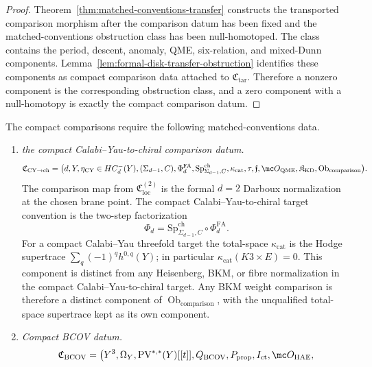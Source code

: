 \begin{proof}
  Theorem~\ref{thm:matched-conventions-transfer} constructs the transported
  comparison morphism after the comparison datum has been fixed and the
  matched-conventions obstruction class has been null-homotoped.  The class
  contains the period, descent, anomaly, QME, six-relation, and
  mixed-Dunn components.  Lemma~\ref{lem:formal-disk-transfer-obstruction}
  identifies these components as compact comparison data attached to
  \(\mathfrak C_{\mathrm{tar}}\).  Therefore a nonzero component is
  the corresponding obstruction class, and a zero component with a
  null-homotopy is exactly the compact comparison datum.
\end{proof}

\begin{defn}\label{defn:compact-comparison-data}
  The compact comparisons require the following matched-conventions data.
  \begin{enumerate}[label=(\roman*)]
    \item \emph{the compact Calabi--Yau-to-chiral comparison datum.}
      \[
      \mathfrak C_{\mathrm{CY\to ch}}=
      \bigl(d,Y,\eta_{\mathrm{CY}}\in HC^-_d(Y),
      (\Sigma_{d-1},C),\Phi^{\mathrm{FA}}_d,
	      \mathrm{Sp}^{\mathrm{ch}}_{\Sigma_{d-1},C},\kappa_{\mathrm{cat}},
      \tau,\mathfrak f,\mc O_{\mathrm{QME}},
      \mathfrak K_{\mathrm{KD}},
      \operatorname{Ob}_{\mathrm{comparison}}\bigr).
      \]
      The comparison map from \(\mathfrak C_{\mathrm{loc}}^{(2)}\) is the
      formal \(d=2\) Darboux normalization at the chosen brane point.
      The compact Calabi--Yau-to-chiral target convention is the two-step factorization
      \[
        \Phi_d=\mathrm{Sp}^{\mathrm{ch}}_{\Sigma_{d-1},C}\circ
        \Phi^{\mathrm{FA}}_d .
      \]
	      For a compact Calabi--Yau threefold target the total-space
	      \(\kappa_{\mathrm{cat}}\) is the Hodge supertrace
	      \(\sum_q(-1)^qh^{0,q}(Y)\); in particular
	      \(\kappa_{\mathrm{cat}}(K3\times E)=0\).  This component is
	      distinct from any Heisenberg, BKM, or fibre normalization in
	      the compact Calabi--Yau-to-chiral target.  Any BKM weight comparison is therefore a distinct
	      component of
      \(\operatorname{Ob}_{\mathrm{comparison}}\), with the unqualified
      total-space supertrace kept as its own component.
    \item \emph{Compact BCOV datum.}
      \[
      \mathfrak C_{\mathrm{BCOV}}=
	      \bigl(Y^3,\Omega_Y,\mathrm{PV}^{*,*}(Y)[[t]],Q_{\mathrm{BCOV}},
	      P_{\mathrm{prop}},I_{\mathrm{ct}},\mc O_{\mathrm{HAE}},
\]
\end{enumerate}
\end{defn}
